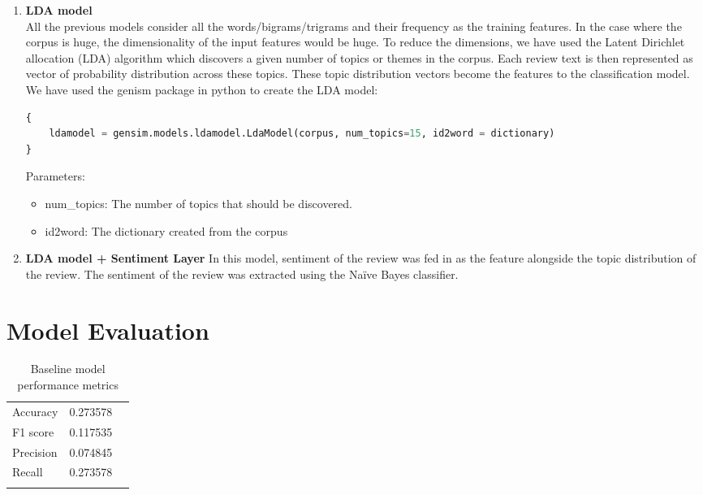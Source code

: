 \documentclass[paper=a4, fontsize=11pt]{scrartcl} %
\numberwithin{equation}{section} %
\numberwithin{figure}{section} %
\numberwithin{table}{section} %
\begin{document}
\begin{enumerate}
\item \textbf{LDA model}\\
All the previous models consider all the words/bigrams/trigrams and their frequency as the training features. In the case where the corpus is huge, the dimensionality of the input features would be huge. To reduce the dimensions, we have used the Latent Dirichlet allocation (LDA) algorithm which discovers a given number of topics or themes in the corpus. Each review text is then represented as vector of probability distribution across these topics. These topic distribution vectors become the features to the classification model.
We have used the genism package in python to create the LDA model:
\begin{lstlisting}[language=python]
{
	ldamodel = gensim.models.ldamodel.LdaModel(corpus, num_topics=15, id2word = dictionary)
}
\end{lstlisting}

Parameters:
\begin{itemize}
\item num\_topics:  The number of topics that should be discovered.
\item id2word: The dictionary created from the corpus
\end{itemize}

\item \textbf{LDA model + Sentiment Layer}
In this model, sentiment of the review was fed in as the feature alongside the topic distribution of the review. The sentiment of the review was extracted using the Naïve Bayes classifier. 
\end{enumerate}

\section{Model Evaluation}
\begin{table}[!htb]
 \centering
 \caption{Baseline model performance metrics}
 \label{baseline_performance}
 \begin{tabular}{l l l} 
    \noalign{\smallskip}\hline\noalign{\smallskip}
    Accuracy & 0.273578\\
    F1 score & 0.117535\\
    Precision & 0.074845\\
    Recall &0.273578\\
    \noalign{\smallskip}\hline
  \end{tabular} 
\end{table}  
\end{document}
